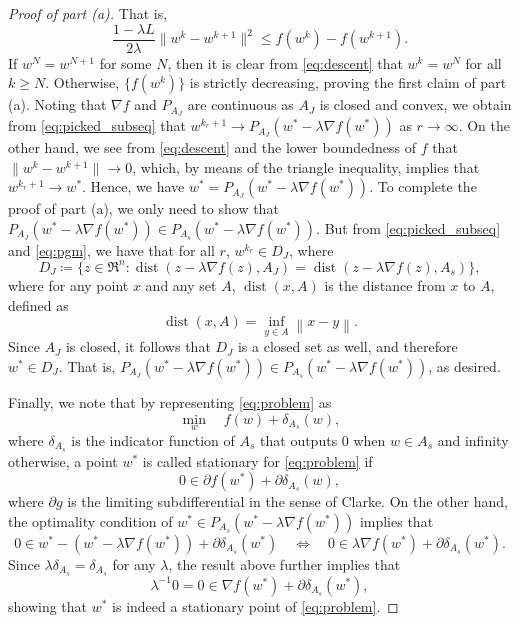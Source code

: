 \documentclass{article}
\newcommand{\alert}[1]{{#1}}
\theoremstyle{plain}
\theoremstyle{definition}
\theoremstyle{remark}
\newcommand{\jh}[1]{\footnote{\textbf{JH:} #1}}
\DeclareMathOperator*{\dist}{dist}
\newcommand{\norm}[1]{{\left\|{#1}\right\|}}
\begin{document}
\begin{proof}[Proof of part (a)]
	That is, 
	\begin{equation}
	\frac{1-\lambda L}{2\lambda}\|w^k - w^{k+1}\|^2 \leq f(w^k) - 
	f(w^{k+1}).
	\label{eq:descent}
	\end{equation}
	\alert{If $w^{N}=w^{N+1}$ for some $N$, then it is clear from 
	\cref{eq:descent} 
	that $w^k=w^N$ for all $k\geq N$. Otherwise, }$\{f(w^k)\}$ is strictly 
	decreasing, proving the first 
	claim of part (a). Noting that $\nabla f$ and $P_{A_J}$ are continuous as 
	$A_J$ is closed and convex, we obtain from 
	\cref{eq:picked_subseq} that $w^{k_r+1} \to P_{A_J} (w^*-\lambda \nabla 
	f(w^*))$ as $r\to\infty$. On the other hand, we see from \cref{eq:descent} 
	and the lower boundedness of $f$
	that $\|w^k - w^{k+1}\|\to 0$, which, by means of the triangle inequality, 
	implies that $w^{k_r+1} \to w^*$. 
	Hence, we have $w^* = P_{A_J}   (w^*-\lambda \nabla 
	f(w^*))$.
	To complete the proof of part (a), we only need to show that 
	$P_{A_J} (w^*-\lambda \nabla 
	f(w^*)) \in P_{A_s} (w^*-\lambda \nabla 
	f(w^*))$. But from \cref{eq:picked_subseq} and \cref{eq:pgm}, we have that 
	for all $r$,  
	$w^{k_r} \in D_J$, where 
	\begin{equation}
	\label{eq:DJ}
	D_J\coloneqq \{ z \in \Re^n : \dist (z-\lambda \nabla f(z), 
	A_J) = \dist (z-\lambda \nabla f(z), A_s)\},
	\end{equation}
	where for any point $x$ and any set $A$, $\dist(x,A)$ is the
	distance from $x$ to $A$, defined as
	\[
		\dist(x,A) = \inf_{y \in A} \norm{x - y}.
	\]
	Since $A_J$ is closed, it 
	follows that $D_J$ is a closed set as well, and therefore $w^*\in D_J$. 
	That is, $P_{A_J} (w^*-\lambda \nabla 
	f(w^*)) \in P_{A_s} (w^*-\lambda \nabla 
	f(w^*))$, as desired. 

	Finally, we note that by representing \cref{eq:problem} as
	\[
		\min_{w}\quad f(w) + \delta_{A_s}(w),
	\]
	where $\delta_{A_s}$ is the indicator function of $A_s$ that
	outputs $0$ when $w \in A_s$ and infinity otherwise,
	a point $w^*$ is called stationary for \cref{eq:problem} if
	\[
		0 \in \partial f(w^*) + \partial \delta_{A_s}(w),
	\]
	where $\partial g$ is the limiting subdifferential in the sense of
	Clarke.
	On the other hand, the optimality condition of
	$w^* \in P_{A_s}(w^* - \lambda
	\nabla f(w^*))$ implies that
	\[
		0 \in w^* - \left( w^* - \lambda \nabla f(w^*) \right) +
		\partial \delta_{A_s}(w^*) \quad \Leftrightarrow \quad
		0 \in \lambda \nabla f(w^*) + \partial \delta_{A_s}(w^*).
	\]
	Since $\lambda \delta_{A_s} = \delta_{A_s}$ for any $\lambda$, the
	result above further implies that
	\[
		\lambda^{-1} 0 = 0 \in \nabla f(w^*) + \partial \delta_{A_s}(w^*),
	\]
	showing that $w^*$ is indeed a stationary point of 
	\cref{eq:problem}.
\end{proof}
\end{document}
